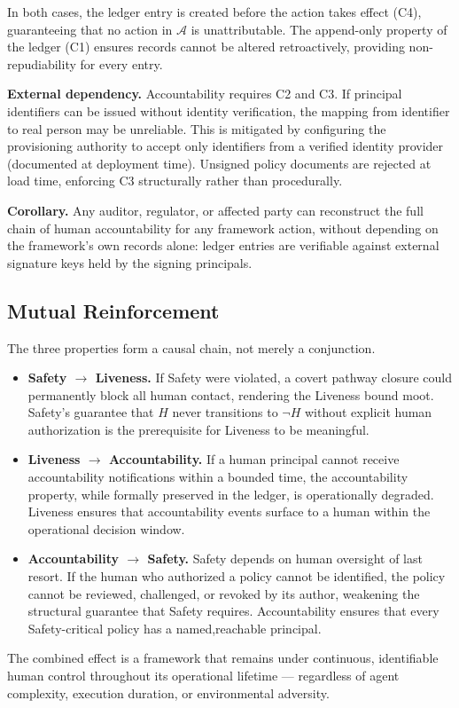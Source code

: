 In both cases, the ledger entry is created before the action takes effect (C4), guaranteeing that no action in $\mathcal{A}$ is unattributable. The append-only property of the ledger (C1) ensures records cannot be altered retroactively, providing non-repudiability for every entry.

\medskip\noindent\textbf{External dependency.} Accountability requires C2 and C3. If principal identifiers can be issued without identity verification, the mapping from identifier to real person may be unreliable. This is mitigated by configuring the provisioning authority to accept only identifiers from a verified identity provider (documented at deployment time). Unsigned policy documents are rejected at load time, enforcing C3 structurally rather than procedurally.

\medskip\noindent\textbf{Corollary.} Any auditor, regulator, or affected party can reconstruct the full chain of human accountability for any framework action, without depending on the framework's own records alone: ledger entries are verifiable against external signature keys held by the signing principals.

\subsection{Mutual Reinforcement}\label{sec:property-interaction}

The three properties form a causal chain, not merely a conjunction.

\begin{itemize}
    \item \textbf{Safety $\rightarrow$ Liveness.} If Safety were violated, a covert pathway closure could permanently block all human contact, rendering the Liveness bound moot. Safety's guarantee that $H$ never transitions to $\neg H$ without explicit human authorization is the prerequisite for Liveness to be meaningful.

    \item \textbf{Liveness $\rightarrow$ Accountability.} If a human principal cannot receive accountability notifications within a bounded time, the accountability property, while formally preserved in the ledger, is operationally degraded. Liveness ensures that accountability events surface to a human within the operational decision window.

    \item \textbf{Accountability $\rightarrow$ Safety.} Safety depends on human oversight of last resort. If the human who authorized a policy cannot be identified, the policy cannot be reviewed, challenged, or revoked by its author, weakening the structural guarantee that Safety requires. Accountability ensures that every Safety-critical policy has a named,reachable principal.
\end{itemize}

The combined effect is a framework that remains under continuous, identifiable human control throughout its operational lifetime — regardless of agent complexity, execution duration, or environmental adversity.


